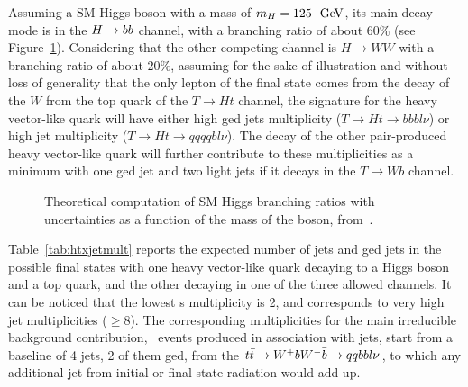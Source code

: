 Assuming a SM Higgs boson with a mass of  $m_H= 125~\gev$,
its main decay mode is in the $H\to \bbbar$ channel, with a branching ratio of about
60\% (see Figure~\ref{fig:HBR}). Considering that the other competing
channel is $H\to WW$ with a branching ratio of about 20\%, assuming for the sake of 
illustration and without loss of generality that the only lepton of the
final state comes from the decay of the $W$ from the top quark of the
$T\to Ht$ channel, the signature for the heavy vector-like quark will
have either high \btag ged jets multiplicity ($T\to Ht\to bbbl\nu $)
or high jet multiplicity ($T\to Ht\to qqqqbl\nu $). The decay of the
other pair-produced heavy vector-like quark will further contribute
to these multiplicities as a minimum with one \btag ged jet and two
light jets if it decays in the $T\to Wb$ channel.
\begin{figure}[htb]\begin{center}
	\caption{Theoretical computation of SM Higgs 
        branching ratios with uncertainties as a function of the 
        mass of the boson, from~\cite{Denner:2011mq}.\label{fig:HBR}}
\end{center}\end{figure}
Table~\ref{tab:htxjetmult} reports the expected number of jets and \btag ged jets
in the possible final states with one heavy vector-like quark decaying
to a Higgs boson and a top quark, and the other decaying in one
of the three allowed channels. It can be noticed that the lowest
\bjet s multiplicity is 2, and corresponds to very high jet multiplicities
($\geq 8$). 
The corresponding multiplicities for the main irreducible background 
contribution, \ttbar\ events produced in association with jets,
start from a baseline of 4 jets, 2 of them \btag ged, from the
$\ttbar\to W^+bW^-\bar{b}\to qqbbl\nu$, to which any additional jet
from initial or final state radiation would add up.

